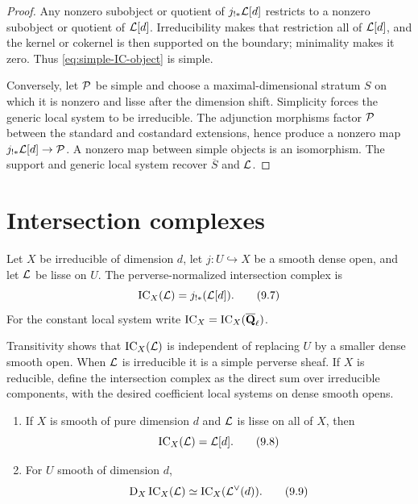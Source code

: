 \begin{proof}
Any nonzero subobject or quotient of \(j_{!*}\mathcal L[d]\) restricts to a nonzero
subobject or quotient of \(\mathcal L[d]\).  Irreducibility makes that restriction
all of \(\mathcal L[d]\), and the kernel or cokernel is then supported on the
boundary; minimality makes it zero.  Thus \eqref{eq:simple-IC-object} is
simple.

Conversely, let \(\mathcal P\) be simple and choose a maximal-dimensional stratum
\(S\) on which it is nonzero and lisse after the dimension shift.  Simplicity
forces the generic local system to be irreducible.  The adjunction morphisms
factor \(\mathcal P\) between the standard and costandard extensions, hence produce a
nonzero map \(j_{!*}\mathcal L[d]\to\mathcal P\).  A nonzero map between simple objects is
an isomorphism.  The support and generic local system recover
\(\overline S\) and \(\mathcal L\).
\end{proof}

\section{Intersection complexes}

\begin{definition}
\label{def:intersection-complex}
Let \(X\) be irreducible of dimension \(d\), let
\(j:U\hookrightarrow X\) be a smooth dense open, and let \(\mathcal L\) be lisse on
\(U\).  The perverse-normalized intersection complex is
\[
  \operatorname{IC}_X(\mathcal L)=j_{!*}(\mathcal L[d]).
\tag{9.7}\label{eq:IC-definition}
\]
For the constant local system write \(\operatorname{IC}_X=\operatorname{IC}_X(\overline{\mathbf Q}_\ell)\).
\end{definition}

Transitivity shows that \(\operatorname{IC}_X(\mathcal L)\) is independent of replacing \(U\) by a
smaller dense smooth open.  When \(\mathcal L\) is irreducible it is a simple
perverse sheaf.  If \(X\) is reducible, define the intersection complex as
the direct sum over irreducible components, with the desired coefficient
local systems on dense smooth opens.

\begin{proposition}
\label{prop:IC-smooth-duality}
\begin{enumerate}
\item If \(X\) is smooth of pure dimension \(d\) and \(\mathcal L\) is lisse on
      all of \(X\), then
      \[
        \operatorname{IC}_X(\mathcal L)=\mathcal L[d].
      \tag{9.8}\label{eq:IC-smooth}
      \]
\item For \(U\) smooth of dimension \(d\),
      \[
        \mathrm D_X\operatorname{IC}_X(\mathcal L)
        \simeq \operatorname{IC}_X(\mathcal L^\vee(d)).
      \tag{9.9}\label{eq:IC-duality}
      \]
\end{enumerate}
\end{proposition}

